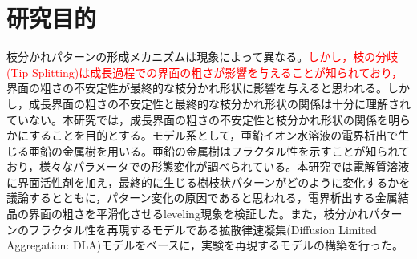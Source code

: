 \documentclass[autodetect-engine,dvi=dvipdfmx,a4paper,ja=standard,oneside,openany,11pt,draft]{bxjsbook}
\begin{document}
\section{研究目的}
枝分かれパターンの形成メカニズムは現象によって異なる。\textcolor{red}{しかし，枝の分岐(Tip Splitting)は成長過程での界面の粗さが影響を与える\cite{}ことが知られており，}界面の粗さの不安定性が最終的な枝分かれ形状に影響を与えると思われる。しかし，成長界面の粗さの不安定性と最終的な枝分かれ形状の関係は十分に理解されていない。本研究では，成長界面の粗さの不安定性と枝分かれ形状の関係を明らかにすることを目的とする。モデル系として，亜鉛イオン水溶液の電界析出で生じる亜鉛の金属樹を用いる。亜鉛の金属樹はフラクタル性を示すことが知られており\cite{matsushita1984fractal}，様々なパラメータでの形態変化が調べられている\cite{suda2003temperature}。本研究では電解質溶液に界面活性剤を加え，最終的に生じる樹枝状パターンがどのように変化するかを議論するとともに，パターン変化の原因であると思われる，電界析出する金属結晶の界面の粗さを平滑化させるleveling現象を検証した。また，枝分かれパターンのフラクタル性を再現するモデルである拡散律速凝集(Diffusion Limited Aggregation: DLA)モデル\cite{witten1981diffusion}をベースに，実験を再現するモデルの構築を行った。

\ifdraft{
  
  
}{}
\end{document}
